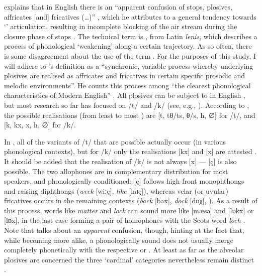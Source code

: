 \citeauthor{knowles1973} explains that in  English there is an ``apparent confusion of stops, plosives, affricates [and] fricatives (\ldots)'' \citeyearpar[251]{knowles1973}, which he attributes to a general  tendency towards `' articulation, resulting in incomplete blocking of the air stream during the closure phase of stops \citeyearpar[cf.][107]{knowles1973}.
The technical term is , from Latin \emph{lenis}, which describes a process of phonological `weakening' along a certain trajectory.
As so often, there is some disagreement about the use of the term \citep[cf.[196]{watson2002}. For the purposes of this study, I will adhere to \citeauthor{honeybone2007}'s definition as a ``synchronic, variable process whereby underlying plosives are realised as affricates and fricatives in certain specific prosodic and melodic environments''.
He counts this process among ``the clearest phonological characteristics of Modern  English'' \citeyearpar[129]{honeybone2007}.
All plosives can be subject to  in  English \citep[cf.][236]{honeybone2001}, but most research so far has focused on /t/ and /k/ (see, e.g., \citealt{honeybone2001, sangster2001, watson2002, watson2006}).
According to \textcite[236]{honeybone2001}, the possible realisations (from least  to most ) are [t, tθ/ts, θ/s, h, ∅] for /t/, and [k, kx, x, h, ∅] for /k/.

In , all of the  variants of /t/ that are possible actually occur (in various phonological contexts), but for /k/ only the realisations [kx] and [x] are attested \parencite[cf][242]{honeybone2001}.
It should be added that the  realisation of /k/ is not always [x] --- [ç] is also possible.
The two allophones are in complementary distribution for most speakers, and phonologically conditioned: [ç] follows high front monophthongs and raising diphthongs (\emph{week} [wiːç], \emph{like} [laɪç]), whereas velar (or uvular) fricatives occurs in the remaining contexts (\emph{back} [bax], \emph{dock} [dɒχ], \citealp[cf.][353]{watson2007}).
As a result of this process, words like \emph{matter} and \emph{lock} can sound more like [mæsə] and [lɒkx] or [lɒx], in the last case forming a pair of homophones with the Scots word \emph{loch} \citep[cf.][73]{trudgill1999}.
Note that \citeauthor{knowles1973} talks about an \emph{apparent} confusion, though, hinting at the fact that, while becoming more alike, a phonologically  sound does not usually merge completely phonetically with the respective  or .
At least as far as the alveolar plosives are concerned the three `cardinal' categories nevertheless remain distinct \parencite[cf.][327 and 252--253]{knowles1973}.


